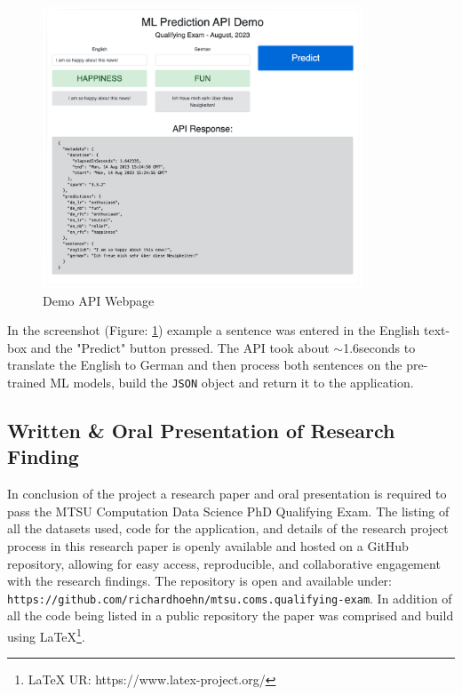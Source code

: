 \documentclass[11pt]{article}
\begin{document}
\begin{figure}[h]
    \centering
    \includegraphics[width=0.85\textwidth]{images/Demo-Api-2.png}
    \caption{Demo API Webpage}
    \label{fig:demo-api-webpage}
\end{figure}

In the screenshot (Figure: \ref{fig:demo-api-webpage}) example a sentence was entered in the English text-box and the "Predict" button pressed. The API took about $\sim$1.6seconds to translate the English to German and then process both sentences on the pre-trained ML models, build the \texttt{JSON} object and return it to the application.

\subsection{Written \& Oral Presentation of Research Finding}
In conclusion of the project a research paper and oral presentation is required to pass the  MTSU Computation Data Science PhD Qualifying Exam. The listing of all the datasets used, code for the application, and details of the research project process in this research paper is openly available and hosted on a GitHub repository, allowing for easy access, reproducible, and collaborative engagement with the research findings. The repository is open and available under: \texttt{https://github.com/richardhoehn/mtsu.coms.qualifying-exam}\cite{Hoehn_Improving_Emotion_Detection_2023}. In addition of all the code being listed in a public repository the paper was comprised and build using \LaTeX\footnote{LaTeX UR: https://www.latex-project.org/}.
\end{document}
